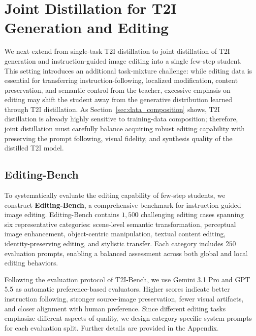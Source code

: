 \documentclass{llmxive}
\begin{document}
\section{Joint Distillation for T2I Generation and Editing}
We next extend from single-task T2I distillation to joint distillation of T2I generation and instruction-guided image editing into a single few-step student. This setting introduces an additional task-mixture challenge: while editing data is essential for transferring instruction-following, localized modification, content preservation, and semantic control from the teacher, excessive emphasis on editing may shift the student away from the generative distribution learned through T2I distillation. As Section~\ref{sec:data_composition} shows, T2I distillation is already highly sensitive to training-data composition; therefore, joint distillation must carefully balance acquiring robust editing capability with preserving the prompt following, visual fidelity, and synthesis quality of the distilled T2I model.


\subsection{Editing-Bench}
To systematically evaluate the editing capability of few-step students, we construct \textbf{Editing-Bench}, a comprehensive benchmark for instruction-guided image editing. Editing-Bench contains $1,500$ challenging editing cases spanning six representative categories: scene-level semantic transformation, perceptual image enhancement, object-centric manipulation, textual content editing, identity-preserving editing, and stylistic transfer. Each category includes $250$ evaluation prompts, enabling a balanced assessment across both global and local editing behaviors. 

Following the evaluation protocol of T2I-Bench, we use Gemini 3.1 Pro and GPT 5.5 as automatic preference-based evaluators. Higher scores indicate better instruction following, stronger source-image preservation, fewer visual artifacts, and closer alignment with human preference. Since different editing tasks emphasize different aspects of quality, we design category-specific system prompts for each evaluation split. Further details are provided in the Appendix.
\end{document}
